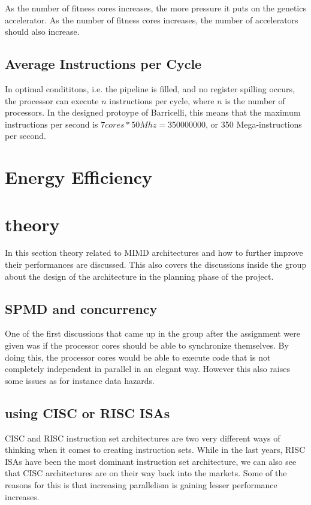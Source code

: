 As the number of fitness cores increases, the more pressure it puts on the genetics accelerator.
As the number of fitness cores increases, the number of accelerators should also increase.

\subsection{Average Instructions per Cycle}

In optimal condititons, i.e.
the pipeline is filled, and no register spilling occurs, the processor can execute $ n $ instructions per cycle, where $ n $ is the number of processors.
In the designed protoype of Barricelli, this means that the maximum instructions per second is $ 7 cores * 50Mhz = 350 000 000 $, or 350 Mega-instructions per second.

\section{Energy Efficiency}

\section{theory}
In this section theory related to MIMD architectures and how to further improve their performances are discussed.
This also covers the discussions inside the group about the design of the architecture in the planning phase of the project.
\subsection{SPMD and concurrency}
One of the first discussions that came up in the group after the assignment were given was if the processor cores should
be able to synchronize themselves.
By doing this, the processor cores would be able to execute code that is not completely independent in parallel in an elegant way.
However this also raises some issues as for instance data hazards.


\subsection{using CISC or RISC ISAs}
CISC and RISC instruction set architectures are two very different ways of thinking when it comes to creating instruction sets.
While in the last years, RISC ISAs have been the most dominant instruction set architecture, we can also see that CISC architectures
are on their way back into the markets.
Some of the reasons for this is that increasing parallelism is gaining lesser performance increases.

